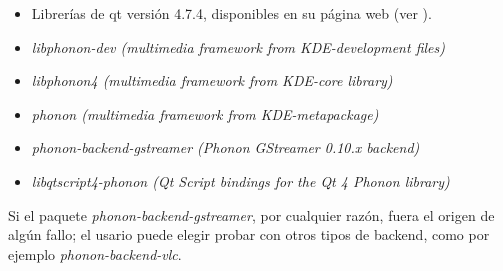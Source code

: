 		\begin{itemize}
			\item Librerías de qt versión 4.7.4, disponibles en su página web (ver \cite{qtlibs}).		
			\item \emph{libphonon-dev (multimedia framework from KDE-development files)} 
			\item \emph{libphonon4 (multimedia framework from KDE-core library)}
			\item \emph{phonon (multimedia framework from KDE-metapackage)}
			\item \emph{phonon-backend-gstreamer (Phonon GStreamer 0.10.x backend)}
			\item \emph{libqtscript4-phonon (Qt Script bindings for the Qt 4 Phonon library)}
			
		\end{itemize}
	
		Si el paquete \emph{phonon-backend-gstreamer}, por cualquier razón, fuera el origen de algún fallo; el usario puede elegir probar con otros tipos de backend, como por ejemplo \emph{phonon-backend-vlc}.